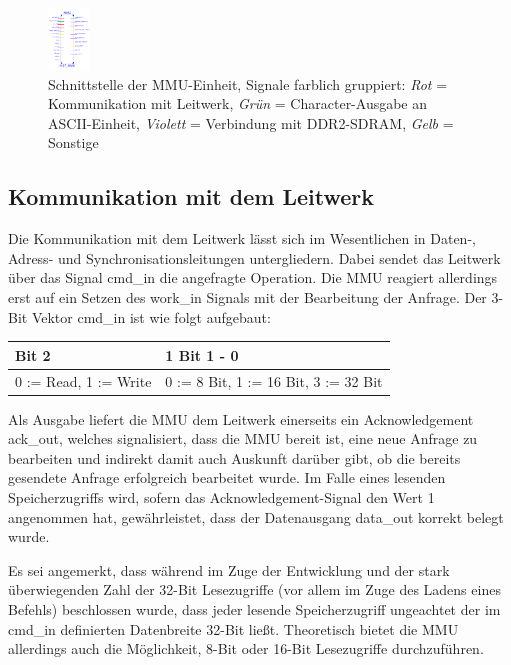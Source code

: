 \begin{figure}[H]
	\centering
		\includegraphics[width=0.1\textwidth]{interface.png}
	\caption{Schnittstelle der MMU-Einheit, Signale farblich gruppiert: \textit{Rot} = Kommunikation mit Leitwerk, \textit{Gr\"un} = Character-Ausgabe an ASCII-Einheit, \textit{Violett} = Verbindung mit DDR2-SDRAM, \textit{Gelb} = Sonstige}
	\label{fig:interface}
\end{figure}

\subsection{Kommunikation mit dem Leitwerk}

Die Kommunikation mit dem Leitwerk l\"asst sich im Wesentlichen in Daten-, Adress- und Synchronisationsleitungen untergliedern. Dabei sendet das Leitwerk \"uber das Signal cmd\_in die angefragte Operation. Die MMU reagiert allerdings erst auf ein Setzen des work\_in Signals mit der Bearbeitung der Anfrage. Der 3-Bit Vektor cmd\_in ist wie folgt aufgebaut:

\begin{center}
	\begin{tabular}{| l | l |}
		\hline
		Bit 2 & 1 Bit 1 - 0 \\ \hline
		0 := Read, 1 := Write & 0 := 8 Bit, 1 := 16 Bit, 3 := 32 Bit \\ 		\hline
	\end{tabular}
\end{center}

Als Ausgabe liefert die MMU dem Leitwerk einerseits ein Acknowledgement ack\_out, welches signalisiert, dass die MMU bereit ist, eine neue Anfrage zu bearbeiten und indirekt damit auch Auskunft dar\"uber gibt, ob die bereits gesendete Anfrage erfolgreich bearbeitet wurde. Im Falle eines lesenden Speicherzugriffs wird, sofern das Acknowledgement-Signal den Wert 1 angenommen hat, gew\"ahrleistet, dass der Datenausgang data\_out korrekt belegt wurde.

Es sei angemerkt, dass w\"ahrend im Zuge der Entwicklung und der stark \"uberwiegenden Zahl der 32-Bit Lesezugriffe (vor allem im Zuge des Ladens eines Befehls) beschlossen wurde, dass jeder lesende Speicherzugriff ungeachtet der im cmd\_in definierten Datenbreite 32-Bit  lie\ss{}t. Theoretisch bietet die MMU allerdings auch die M\"oglichkeit, 8-Bit oder 16-Bit Lesezugriffe durchzuf\"uhren.

